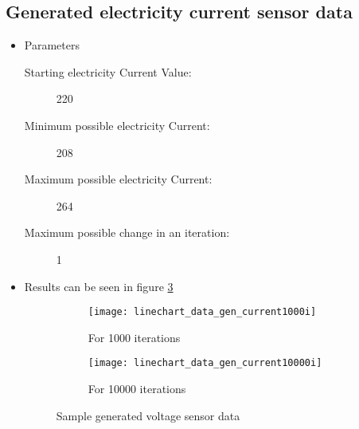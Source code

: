                     \subsection{Generated electricity current sensor data}
                        \begin{itemize}
                            \item Parameters
                                \begin{description}
                                    \item[Starting electricity Current Value:] 220
                                    \item[Minimum possible electricity Current:] 208
                                    \item[Maximum possible electricity Current:] 264
                                    \item[Maximum possible change in an iteration:] 1
                                \end{description}
                            \item Results can be seen in figure \ref{fig:gen_voltage}
                                \begin{figure}
                                    \centering
                                    \captionsetup{type=figure}
                                    \begin{subfigure}[b]{0.45\textwidth}
                                        \centering
                                        \texttt{[image: linechart\_data\_gen\_current1000i]}
                                        \caption{For 1000 iterations}
                                        \label{chart:gen_current_1000}
                                    \end{subfigure}
                                    \hfill
                                    \begin{subfigure}[b]{0.45\textwidth}
                                        \centering
                                        \texttt{[image: linechart\_data\_gen\_current10000i]}
                                        \caption{For 10000 iterations}
                                        \label{chart:gen_current_10000}
                                    \end{subfigure}
                                    
                                    \caption{Sample generated voltage sensor data }
                                    \label{fig:gen_voltage}
                            \end{figure}
                        \end{itemize}
        
